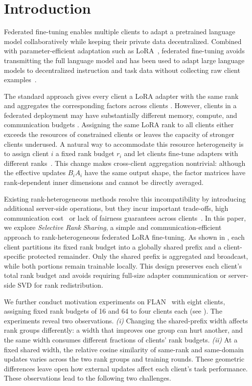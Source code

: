 \section{Introduction}
\label{sec:intro}

Federated fine-tuning enables multiple clients to adapt a pretrained language
model collaboratively while keeping their private data decentralized.
Combined with parameter-efficient adaptation such as LoRA~\cite{hu2022lora},
federated fine-tuning avoids transmitting the full language model and has been
used to adapt large language models to decentralized instruction and task data
without collecting raw client examples~\cite{mcmahan2017fedavg,zhang2024fedit,sun2024ffalora}.

The standard approach gives every client a LoRA adapter with the same rank and
aggregates the corresponding factors across clients \cite{zhang2024fedit}.
However, clients in a federated deployment may have substantially different
memory, compute, and communication budgets .
Assigning the same LoRA rank to all clients either exceeds the resources of
constrained clients or leaves the capacity of stronger clients underused.
A natural way to accommodate this resource heterogeneity is to assign client
$i$ a fixed rank budget $r_i$ and let clients fine-tune adapters with different
ranks~\cite{bai2024flexlora,wang2024flora,cho2024hetlora}.
This change makes cross-client aggregation nontrivial: although the effective
updates $B_iA_i$ have the same output shape, the factor matrices have
rank-dependent inner dimensions and cannot be directly averaged.

Existing rank-heterogeneous methods resolve this incompatibility by introducing
additional server-side operations, but they incur important trade-offs, 
\eg high communication cost~\cite{wang2024flora} or lack of fairness guarantees across clients~\cite{bai2024flexlora}.
In this paper, we explore \textit{Selective Rank Sharing}, a simple and
communication-efficient approach to rank-heterogeneous federated LoRA
fine-tuning.
As shown in , each client partitions its fixed rank budget into a globally shared prefix and a client-specific protected remainder.
Only the shared prefix is aggregated and broadcast, while both portions remain trainable locally.
This design preserves each client's total rank budget and avoids requiring
full-size adapter communication or server-side SVD for rank redistribution.

We further conduct motivation experiments on FLAN~\cite{wei2022finetuned} with eight clients, assigning fixed rank budgets of 16 and 64 to four clients each (see ).
The experiments reveal two observations.
\textit{(i)} Changing the shared-prefix width affects rank groups differently: a
width that improves one group can hurt another, and the same width consumes
different fractions of clients' rank budgets.
\textit{(ii)} At a fixed shared width, the relative cosine similarity of same-rank and same-domain updates varies across the two rank groups and training rounds.
These geometric differences leave open how external updates affect each client's task performance.
These observations lead to the following two challenges.

